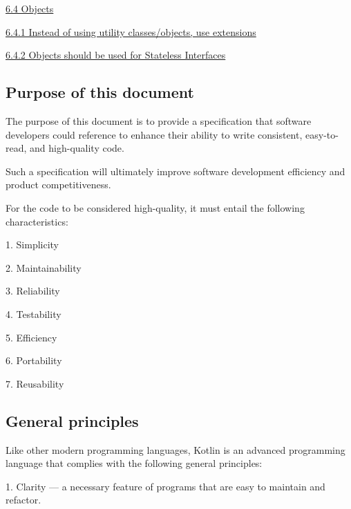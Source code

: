 \hspace{0.5cm}\hyperref[sec:6.4]{ 6.4 Objects}

\hspace{1.0cm}\hyperref[sec:6.4.1]{ 6.4.1 Instead of using utility classes/objects, use extensions}

\hspace{1.0cm}\hyperref[sec:6.4.2]{ 6.4.2 Objects should be used for Stateless Interfaces}

\hspace{0.0cm}\hyperref[sec:]{}

\hspace{0.0cm}\hyperref[sec:]{}

\subsection*{\textbf{Purpose of this document}}

\label{sec:}



The purpose of this document is to provide a specification that software developers could reference to enhance their ability to write consistent, easy-to-read, and high-quality code.

Such a specification will ultimately improve software development efficiency and product competitiveness.

For the code to be considered high-quality, it must entail the following characteristics:

1.	Simplicity

2.	Maintainability

3.	Reliability

4.	Testability

5.	Efficiency

6.	Portability

7.	Reusability





\subsection*{\textbf{General principles}}

\label{sec:}



Like other modern programming languages, Kotlin is an advanced programming language that complies with the following general principles:

1.	Clarity — a necessary feature of programs that are easy to maintain and refactor.

